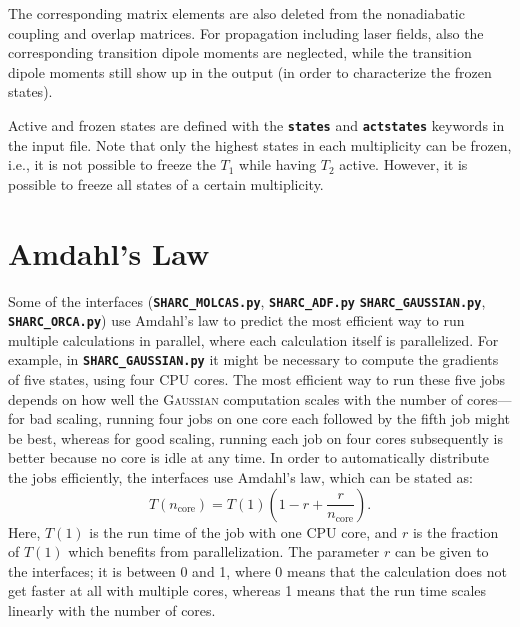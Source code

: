 \documentclass[a4paper,10pt,DIV=15,openany]{scrbook}
\newcommand{\ttt}[1]{\textbf{\texttt{#1}}}
\begin{document}
The corresponding matrix elements are also deleted from the nonadiabatic coupling and overlap matrices. For propagation including laser fields, also the corresponding transition dipole moments are neglected, while the transition dipole moments still show up in the output (in order to characterize the frozen states).

Active and frozen states are defined with the \ttt{states} and \ttt{actstates} keywords in the input file. Note that only the highest states in each multiplicity can be frozen, i.e., it is not possible to freeze the $T_1$ while having $T_2$ active. However, it is possible to freeze all states of a certain multiplicity.


\section{Amdahl's Law}\label{met:amdahl}

Some of the interfaces (\ttt{SHARC\_MOLCAS.py}, \ttt{SHARC\_ADF.py} \ttt{SHARC\_GAUSSIAN.py}, \ttt{SHARC\_ORCA.py}) use Amdahl's law to predict the most efficient way to run multiple calculations in parallel, where each calculation itself is parallelized.
For example, in \ttt{SHARC\_GAUSSIAN.py} it might be necessary to compute the gradients of five states, using four CPU cores.
The most efficient way to run these five jobs depends on how well the \textsc{Gaussian} computation scales with the number of cores---for bad scaling, running four jobs on one core each followed by the fifth job might be best, whereas for good scaling, running each job on four cores subsequently is better because no core is idle at any time.
In order to automatically distribute the jobs efficiently, the interfaces use Amdahl's law, which can be stated as:
\begin{equation}
  T(n_\text{core})
  =
  T(1)
  \left(
    1-r+\frac{r}{n_\text{core}}
  \right).
\end{equation}
Here, $T(1)$ is the run time of the job with one CPU core, and $r$ is the fraction of $T(1)$ which benefits from parallelization.
The parameter $r$ can be given to the interfaces; it is between 0 and 1, where 0 means that the calculation does not get faster at all with multiple cores, whereas 1 means that the run time scales linearly with the number of cores.

\end{document}
